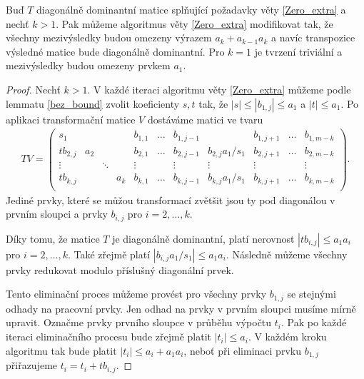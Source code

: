 \begin{lem} \label{Zero_extra_modified}
Buď $ T $ diagonálně dominantní matice splňující požadavky věty \ref{Zero_extra} 
a nechť $ k > 1 $.
Pak můžeme algoritmus věty \ref{Zero_extra} modifikovat tak, že všechny
mezivýsledky budou omezeny výrazem $ a_k + a_{k - 1} a_k $ 
a navíc transpozice výsledné matice bude diagonálně dominantní.
Pro $ k = 1 $ je tvrzení triviální a mezivýsledky budou omezeny prvkem $ a_1 $.
\end{lem}
\begin{proof}
Nechť $ k > 1 $. V každé iteraci algoritmu věty \ref{Zero_extra} můžeme podle lemmatu
\ref{bez_bound} zvolit koeficienty $ s, t $ tak, že $ |s| \leq |b_{1,j}| \leq a_1$
a $ |t| \leq a_1 $. Po aplikaci transformační matice $ V $ dostáváme matici ve
tvaru
\begin{align*}
TV =
    \left(
    \begin{array}{cccc|ccccccc}
        s_1      &     &        &     & b_{1,1} & \hdots & b_{1,j-1} &                   & b_{1,j+1} & \hdots & b_{1,m-k} \\
        tb_{2,j} & a_2 &        &     & b_{2,1} & \hdots & b_{2,j-1} & b_{2,j} a_1 / s_1 & b_{2,j+1} & \hdots & b_{2,m-k} \\
        \vdots   &     & \ddots &     & \vdots  &        & \vdots    & \vdots            & \vdots    &        & \vdots    \\
        tb_{k,j} &     &        & a_k & b_{k,1} & \hdots & b_{k,j-1} & b_{k,j} a_1 / s_1 & b_{k,j+1} & \hdots & b_{k,m-k} \\
    \end{array}
    \right).
\end{align*}
Jediné prvky, které se můžou transformací zvětšit jsou ty pod diagonálou v 
prvním sloupci a prvky $ b_{i,j} $ pro $ i = 2,\dots,k $.

Díky tomu, že matice $ T $ je diagonálně dominantní, platí nerovnost
$ |tb_{i,j}| \leq a_1 a_i $ pro $ i = 2,\dots,k $. Také zřejmě platí
$ | b_{i,j} a_1 / s_1 | \leq a_1 a_i $. Následně můžeme všechny prvky redukovat
modulo příslušný diagonální prvek.

Tento eliminační proces můžeme provést pro všechny prvky $ b_{1, j} $ se stejnými
odhady na pracovní prvky. Jen odhad na prvky v prvním sloupci musíme mírně upravit.
Označme prvky prvního sloupce v průběhu výpočtu $ t_i $. Pak po každé iteraci
eliminačního procesu bude zřejmě platit $ |t_i| \leq a_i $. V každém kroku
algoritmu tak bude platit $ |t_i| \leq a_i + a_1 a_i $, neboť při eliminaci
prvku $ b_{1,j} $ přiřazujeme $ t_i = t_i + tb_{i,j} $.


\end{proof}
